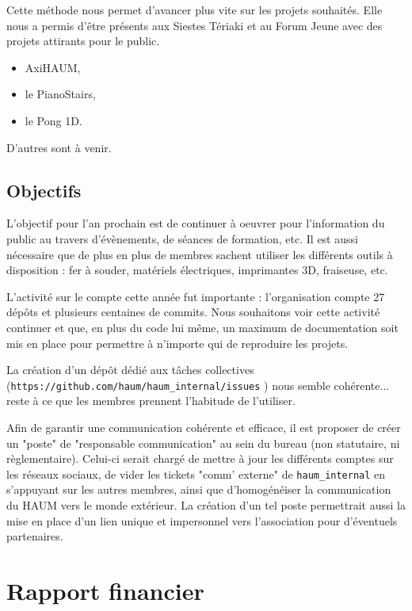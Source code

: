 \documentclass[a4paper, 11pt]{article}
\begin{document}
Cette méthode nous permet d'avancer plus vite sur les projets souhaités. Elle nous a permis d'être présents aux Siestes Tériaki et au Forum Jeune avec des projets attirants pour le public. 
    
\begin{itemize}
    \item AxiHAUM,
    \item le PianoStairs,
    \item le Pong 1D.
\end{itemize}

D'autres sont à venir.

\subsection{Objectifs}

L'objectif pour l'an prochain est de continuer à oeuvrer pour l'information du public au travers d'évènements, de séances de formation, etc.
Il est aussi nécessaire que de plus en plus de membres sachent utiliser les différents outils à disposition : fer à souder, matériels électriques, imprimantes 3D, fraiseuse, etc.

L'activité sur le compte cette année fut importante : l'organisation compte 27 dépôts et plusieurs centaines de commits. Nous souhaitons voir cette activité continuer et que, en plus du code lui même, un maximum de documentation soit mis en place pour permettre à n'importe qui de reproduire les projets.

La création d'un dépôt dédié aux tâches collectives (\texttt{https://github.com/haum/haum\_internal/issues} ) nous semble cohérente... reste à ce que les membres prennent l'habitude de l'utiliser.

Afin de garantir une communication cohérente et efficace, il est proposer de créer un "poste" de "responsable communication" au sein du bureau (non statutaire, ni règlementaire).
Celui-ci serait chargé de mettre à jour les différents comptes sur les réseaux sociaux, de vider les tickets "comm' externe" de \texttt{haum\_internal} en s'appuyant sur les autres
membres, ainsi que d'homogénéiser la communication du HAUM vers le monde extérieur. La création d'un tel poste permettrait aussi la mise en place d'un lien unique et impersonnel vers l'association pour d'éventuels partenaires.

\section{Rapport financier}
\end{document}
